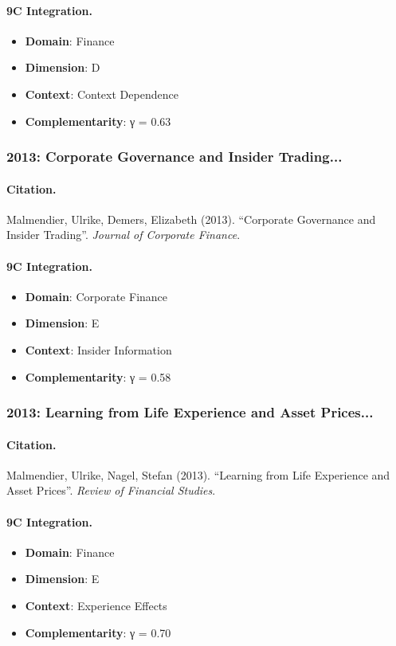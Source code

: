 \paragraph{9C Integration.}
\begin{itemize}[nosep]
  \item \textbf{Domain}: Finance
  \item \textbf{Dimension}: D
  \item \textbf{Context}: Context Dependence
  \item \textbf{Complementarity}: γ = 0.63
\end{itemize}


\subsubsection{2013: Corporate Governance and Insider Trading...}

\paragraph{Citation.}
Malmendier, Ulrike, Demers, Elizabeth (2013). ``Corporate Governance and Insider Trading''. \textit{Journal of Corporate Finance}.

\paragraph{9C Integration.}
\begin{itemize}[nosep]
  \item \textbf{Domain}: Corporate Finance
  \item \textbf{Dimension}: E
  \item \textbf{Context}: Insider Information
  \item \textbf{Complementarity}: γ = 0.58
\end{itemize}


\subsubsection{2013: Learning from Life Experience and Asset Prices...}

\paragraph{Citation.}
Malmendier, Ulrike, Nagel, Stefan (2013). ``Learning from Life Experience and Asset Prices''. \textit{Review of Financial Studies}.

\paragraph{9C Integration.}
\begin{itemize}[nosep]
  \item \textbf{Domain}: Finance
  \item \textbf{Dimension}: E
  \item \textbf{Context}: Experience Effects
  \item \textbf{Complementarity}: γ = 0.70
\end{itemize}


